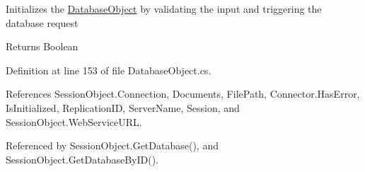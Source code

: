 Initializes the \mbox{\hyperlink{class_database_object}{Database\+Object}} by validating the input and triggering the database request 

\begin{DoxyReturn}{Returns}
Boolean
\end{DoxyReturn}


Definition at line 153 of file Database\+Object.\+cs.



References Session\+Object.\+Connection, Documents, File\+Path, Connector.\+Has\+Error, Is\+Initialized, Replication\+ID, Server\+Name, Session, and Session\+Object.\+Web\+Service\+U\+RL.



Referenced by Session\+Object.\+Get\+Database(), and Session\+Object.\+Get\+Database\+By\+I\+D().


